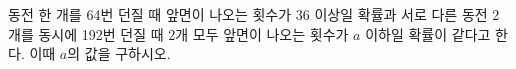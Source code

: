 동전 한 개를 64번 던질 때 앞면이 나오는 횟수가 36 이상일 확률과 서로 다른 동전 2개를 동시에 192번 던질 때 2개 모두 앞면이 나오는 횟수가 $a$ 이하일 확률이 같다고 한다. 이때 $a$의 값을 구하시오.
